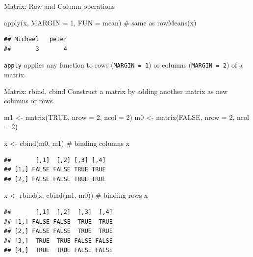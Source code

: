 \documentclass[
  9pt,
  ignorenonframetext,
]{beamer}
\newenvironment{Shaded}{\begin{snugshade}}{\end{snugshade}}
\newcommand{\CommentTok}[1]{\textcolor[rgb]{0.50,0.62,0.50}{#1}}
\newcommand{\DataTypeTok}[1]{\textcolor[rgb]{0.87,0.87,0.75}{#1}}
\newcommand{\DecValTok}[1]{\textcolor[rgb]{0.86,0.86,0.80}{#1}}
\newcommand{\KeywordTok}[1]{\textcolor[rgb]{0.94,0.87,0.69}{#1}}
\newcommand{\NormalTok}[1]{\textcolor[rgb]{0.80,0.80,0.80}{#1}}
\newcommand{\OtherTok}[1]{\textcolor[rgb]{0.94,0.94,0.56}{#1}}
\newcommand{\StringTok}[1]{\textcolor[rgb]{0.80,0.58,0.58}{#1}}
\begin{document}
\begin{frame}[fragile]{Matrix: Row and Column operations}
\begin{Shaded}
\begin{Highlighting}[]
\KeywordTok{apply}\NormalTok{(x, }\DataTypeTok{MARGIN =} \DecValTok{1}\NormalTok{, }\DataTypeTok{FUN =}\NormalTok{ mean) }\CommentTok{\# same as rowMeans(x)}
\end{Highlighting}
\end{Shaded}

\begin{verbatim}
## Michael   peter 
##       3       4
\end{verbatim}

\vfill

\begin{block}{}
\protect\hypertarget{section-1}{}
\texttt{apply} applies any function to rows (\texttt{MARGIN\ =\ 1}) or
columns (\texttt{MARGIN\ =\ 2}) of a matrix.
\end{block}
\end{frame}

\begin{frame}[fragile]{Matrix: rbind, cbind}
\protect\hypertarget{matrix-rbind-cbind}{}
Construct a matrix by adding another matrix as new columns or rows.

\begin{Shaded}
\begin{Highlighting}[]
\NormalTok{m1 \textless{}{-}}\StringTok{ }\KeywordTok{matrix}\NormalTok{(}\OtherTok{TRUE}\NormalTok{, }\DataTypeTok{nrow =} \DecValTok{2}\NormalTok{, }\DataTypeTok{ncol =} \DecValTok{2}\NormalTok{)}
\NormalTok{m0 \textless{}{-}}\StringTok{ }\KeywordTok{matrix}\NormalTok{(}\OtherTok{FALSE}\NormalTok{, }\DataTypeTok{nrow =} \DecValTok{2}\NormalTok{, }\DataTypeTok{ncol =} \DecValTok{2}\NormalTok{)}

\NormalTok{x \textless{}{-}}\StringTok{ }\KeywordTok{cbind}\NormalTok{(m0, m1) }\CommentTok{\# binding columns}
\NormalTok{x}
\end{Highlighting}
\end{Shaded}

\begin{verbatim}
##       [,1]  [,2] [,3] [,4]
## [1,] FALSE FALSE TRUE TRUE
## [2,] FALSE FALSE TRUE TRUE
\end{verbatim}

\begin{Shaded}
\begin{Highlighting}[]
\NormalTok{x \textless{}{-}}\StringTok{ }\KeywordTok{rbind}\NormalTok{(x, }\KeywordTok{cbind}\NormalTok{(m1, m0)) }\CommentTok{\# binding rows}
\NormalTok{x}
\end{Highlighting}
\end{Shaded}

\begin{verbatim}
##       [,1]  [,2]  [,3]  [,4]
## [1,] FALSE FALSE  TRUE  TRUE
## [2,] FALSE FALSE  TRUE  TRUE
## [3,]  TRUE  TRUE FALSE FALSE
## [4,]  TRUE  TRUE FALSE FALSE
\end{verbatim}
\end{frame}
\end{document}
